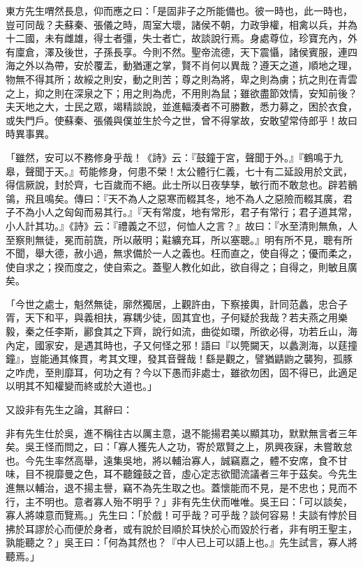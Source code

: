 \begin{pinyinscope}
東方先生喟然長息，仰而應之曰：「是固非子之所能備也。彼一時也，此一時也，豈可同哉？夫蘇秦、張儀之時，周室大壞，諸侯不朝，力政爭權，相禽以兵，并為十二國，未有雌雄，得士者彊，失士者亡，故談說行焉。身處尊位，珍寶充內，外有廩倉，澤及後世，子孫長享。今則不然。聖帝流德，天下震懾，諸侯賓服，連四海之外以為帶，安於覆盂，動猶運之掌，賢不肖何以異哉？遵天之道，順地之理，物無不得其所；故綏之則安，動之則苦；尊之則為將，卑之則為虜；抗之則在青雲之上，抑之則在深泉之下；用之則為虎，不用則為鼠；雖欲盡節效情，安知前後？夫天地之大，士民之眾，竭精談說，並進輻湊者不可勝數，悉力募之，困於衣食，或失門戶。使蘇秦、張儀與僕並生於今之世，曾不得掌故，安敢望常侍郎乎！故曰時異事異。

「雖然，安可以不務修身乎哉！《詩》云：『鼓鐘于宮，聲聞于外。』『鶴鳴于九皋，聲聞于天。』苟能修身，何患不榮！太公體行仁義，七十有二延設用於文武，得信厥說，封於齊，七百歲而不絕。此士所以日夜孳孳，敏行而不敢怠也。辟若鶺鴒，飛且鳴矣。傳曰：『天不為人之惡寒而輟其冬，地不為人之惡險而輟其廣，君子不為小人之匈匈而易其行。』『天有常度，地有常形，君子有常行；君子道其常，小人計其功。』《詩》云：『禮義之不愆，何恤人之言？』故曰：『水至清則無魚，人至察則無徒，冕而前旒，所以蔽明；黈纊充耳，所以塞聰。』明有所不見，聰有所不聞，舉大德，赦小過，無求備於一人之義也。枉而直之，使自得之；優而柔之，使自求之；揆而度之，使自索之。蓋聖人教化如此，欲自得之；自得之，則敏且廣矣。

「今世之處士，魁然無徒，廓然獨居，上觀許由，下察接輿，計同范蠡，忠合子胥，天下和平，與義相扶，寡耦少徒，固其宜也，子何疑於我哉？若夫燕之用樂毅，秦之任李斯，酈食其之下齊，說行如流，曲從如環，所欲必得，功若丘山，海內定，國家安，是遇其時也，子又何怪之邪！語曰『以筦闚天，以蠡測海，以莛撞鐘』，豈能通其條貫，考其文理，發其音聲哉！繇是觀之，譬猶鼱鼩之襲狗，孤豚之咋虎，至則靡耳，何功之有？今以下愚而非處士，雖欲勿困，固不得已，此適足以明其不知權變而終或於大道也。」

又設非有先生之論，其辭曰：

非有先生仕於吳，進不稱往古以厲主意，退不能揚君美以顯其功，默默無言者三年矣。吳王怪而問之，曰：「寡人獲先人之功，寄於眾賢之上，夙興夜寐，未嘗敢怠也。今先生率然高舉，遠集吳地，將以輔治寡人，誠竊嘉之，體不安席，食不甘味，目不視靡曼之色，耳不聽鐘鼓之音，虛心定志欲聞流議者三年于茲矣。今先生進無以輔治，退不揚主譽，竊不為先生取之也。蓋懷能而不見，是不忠也；見而不行，主不明也。意者寡人殆不明乎？」非有先生伏而唯唯。吳王曰：「可以談矣，寡人將竦意而覽焉。」先生曰：「於戲！可乎哉？可乎哉？談何容易！夫談有悖於目拂於耳謬於心而便於身者，或有說於目順於耳快於心而毀於行者，非有明王聖主，孰能聽之？」吳王曰：「何為其然也？『中人已上可以語上也。』先生試言，寡人將聽焉。」


\end{pinyinscope}
